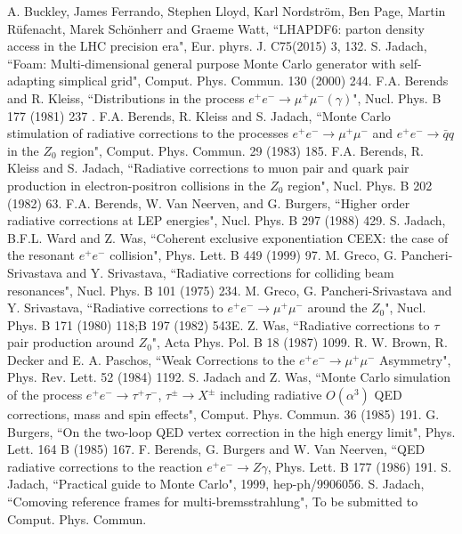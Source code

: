 \documentclass
[
]
{thesis}
\begin{document}
\begin{thebibliography}{widestlabel}
	
	 A. Buckley, James Ferrando, Stephen Lloyd, Karl Nordstr\"om, Ben Page, Martin Rüfenacht, Marek Sch\"onherr and Graeme Watt, 
	``LHAPDF6: parton density access in the LHC precision era", Eur. phyrs. J. C75(2015) 3, 132.
	 S. Jadach, ``Foam: Multi-dimensional general purpose Monte Carlo generator with self-adapting simplical grid", Comput. Phys. Commun. 130 (2000) 244.
	 F.A. Berends and R. Kleiss, ``Distributions in the process $e^+e^-\to\mu^+\mu^-(\gamma)$", Nucl. Phys. B 177 (1981) 237 .
	 F.A. Berends, R. Kleiss and S. Jadach, ``Monte Carlo stimulation of radiative corrections to the processes $e^+e^-\to\mu^+\mu^-$ and $e^+e^-\to\bar{q}q$ in the $Z_0$ region", Comput. Phys. Commun. 29 (1983) 185.
	 F.A. Berends, R. Kleiss and S. Jadach, ``Radiative corrections to muon pair and quark pair production in electron-positron collisions in the $Z_0$ region", Nucl. Phys. B 202 (1982) 63.
	 F.A. Berends, W. Van Neerven, and G. Burgers, ``Higher order radiative corrections at LEP energies", Nucl. Phys. B 297 (1988) 429.
	 S. Jadach, B.F.L. Ward and  Z.  Was, ``Coherent exclusive exponentiation CEEX: the case of the resonant $e^+e^-$ collision", Phys. Lett. B 449 (1999) 97.
	 M. Greco, G. Pancheri-Srivastava and Y. Srivastava, ``Radiative corrections for colliding beam resonances", Nucl. Phys. B 101 (1975) 234.
	 M. Greco, G. Pancheri-Srivastava and Y. Srivastava, ``Radiative corrections to $e^+e^-\to\mu^+\mu^-$ around the $Z_0$", Nucl. Phys. B 171 (1980) 118;B 197 (1982) 543E.
	 Z. Was, ``Radiative corrections to $\tau$ pair production around $Z_0$", Acta Phys. Pol. B 18 (1987) 1099.
	 R. W. Brown, R. Decker and  E. A. Paschos, ``Weak Corrections to the $e^+e^-\to\mu^+\mu^-$ Asymmetry", Phys.  Rev. Lett. 52 (1984) 1192.
	 S. Jadach and Z. Was, ``Monte Carlo simulation of the process $e^+e^-\to\tau^+\tau^-$, $\tau^\pm\to X^\pm$ including radiative $O(\alpha^3)$
	QED corrections, mass and spin effects", Comput. Phys. Commun. 36 (1985) 191.
	 G. Burgers, ``On the two-loop QED vertex correction in the high energy limit", Phys. Lett. 164 B (1985) 167.
	 F. Berends, G. Burgers and W. Van Neerven, ``QED radiative corrections to the reaction $e^+e^-\to Z\gamma$, Phys. Lett. B 177 (1986) 191.
	 S. Jadach, ``Practical guide to Monte Carlo", 1999, hep-ph/9906056.
	S. Jadach, ``Comoving reference frames for multi-bremsstrahlung", To be submitted to Comput. Phys. Commun.

\end{thebibliography}
\end{document}
